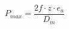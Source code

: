 \documentclass[12pt]{article}
\begin{document}
\begin{displaymath}
P_{max} = \frac {2f \cdot z \cdot e_a} {D_m}
\end{displaymath}
\end{document}
